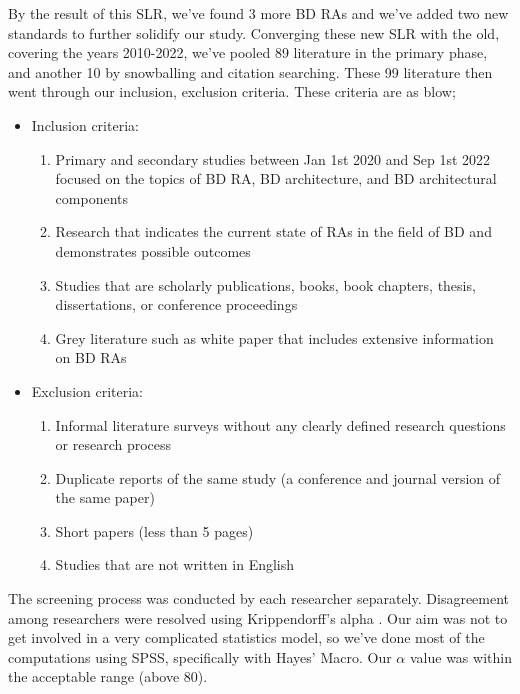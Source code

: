 \documentclass[review]{elsarticle}
\begin{document}
\begin{enumerate}
    By the result of this SLR, we've found 3 more BD RAs \cite{AtaeiApsec,castellanos2021smart,sang2017simplifying} and we've added two new standards \cite{ISO20546,ISO20547} to further solidify our study. Converging these new SLR with the old, covering the years 2010-2022, we've pooled 89 literature in the primary phase, and another 10 by snowballing and citation searching. These 99 literature then went through our inclusion, exclusion criteria. These criteria are as blow;

    \begin{itemize}
        \item Inclusion criteria:
        \begin{enumerate}
            \item Primary and secondary studies between Jan 1st 2020 and Sep 1st 2022 focused on the topics of BD RA, BD architecture, and BD architectural components
            \item Research that indicates the current state of RAs in the field of BD and demonstrates possible outcomes
            \item Studies that are scholarly publications, books, book chapters, thesis, dissertations, or conference proceedings 
            \item Grey literature such as white paper that includes extensive information on BD RAs
        \end{enumerate}
        \item Exclusion criteria:
        \begin{enumerate}
            \item Informal literature surveys without any clearly defined research questions or research process
            \item Duplicate reports of the same study (a conference and journal version of the same paper)
            \item Short papers (less than 5 pages)
            \item Studies that are not written in English
        \end{enumerate}
    \end{itemize}
\end{enumerate}

The screening process was conducted by each researcher separately. Disagreement among researchers were resolved using Krippendorff’s alpha \cite{krippendorff2011computing}. Our aim was not to get involved in a very complicated statistics model, so we've done most of the computations using SPSS, specifically with Hayes’ Macro. Our $ \alpha $ value was within the acceptable range (above 80). 
\end{document}
